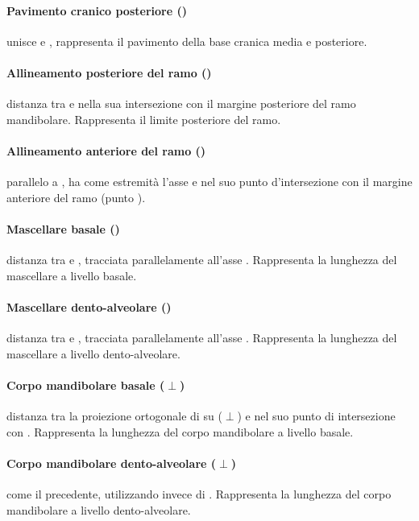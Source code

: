 \paragraph{Pavimento cranico posteriore ()} unisce  e , rappresenta il pavimento della base cranica media e posteriore.
\paragraph{Allineamento posteriore del ramo ()} distanza tra  e  nella sua intersezione con il margine posteriore del ramo mandibolare. Rappresenta il limite posteriore del ramo.
\paragraph{Allineamento anteriore del ramo ()} parallelo a , ha come estremità l'asse  e  nel suo punto d'intersezione con il margine anteriore del ramo (punto ).
\paragraph{Mascellare basale ()} distanza tra  e , tracciata parallelamente all'asse . Rappresenta la lunghezza del mascellare a livello basale.
\paragraph{Mascellare dento-alveolare ()} distanza tra  e , tracciata parallelamente all'asse . Rappresenta la lunghezza del mascellare a livello dento-alveolare.
\paragraph{Corpo mandibolare basale ($\perp$)} distanza tra la proiezione ortogonale di  su  ($\perp$) e  nel suo punto di intersezione con . Rappresenta la lunghezza del corpo mandibolare a livello basale.
\paragraph{Corpo mandibolare dento-alveolare ($\perp$)} come il precedente, utilizzando  invece di . Rappresenta la lunghezza del corpo mandibolare a livello dento-alveolare.
